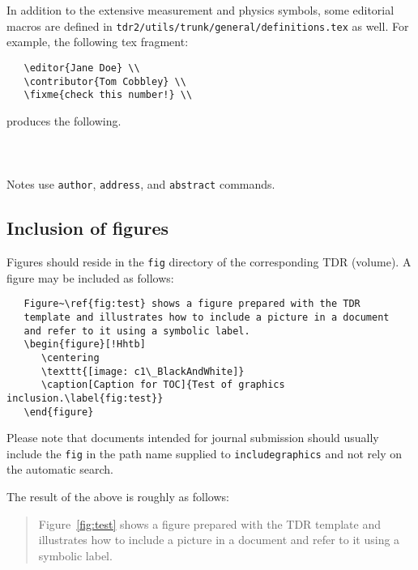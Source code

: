 In addition to the extensive measurement and physics symbols,
some editorial macros are defined in
\texttt{tdr2/utils/trunk/general/definitions.tex} as well.
For example, the following tex fragment:
\begin{verbatim}
   \editor{Jane Doe} \\
   \contributor{Tom Cobbley} \\
   \fixme{check this number!} \\
\end{verbatim}
%
produces the following. \\
\bigbreak
{}\mbox{~}\\
\mbox{~} \\
\mbox{~}\\

Notes use \texttt{author}, \texttt{address}, and \texttt{abstract} commands.



\subsection{Inclusion of figures}

Figures should reside in the \texttt{fig} directory of the corresponding TDR (volume).
A figure may be included as follows:
%
\begin{verbatim}
   Figure~\ref{fig:test} shows a figure prepared with the TDR
   template and illustrates how to include a picture in a document
   and refer to it using a symbolic label.
   \begin{figure}[!Hhtb]
      \centering
      \texttt{[image: c1\_BlackAndWhite]}
      \caption[Caption for TOC]{Test of graphics inclusion.\label{fig:test}}
   \end{figure}
\end{verbatim}
%
Please note that documents intended for journal submission should usually include the \texttt{fig} in the path name supplied to \texttt{includegraphics} and not rely on the automatic search.

The result of the above is roughly as follows:
%

\begin{quote}
Figure~\ref{fig:test} shows a figure prepared with the TDR
    template and illustrates how to include
a picture in a document and refer to it using a symbolic label.
\end{quote}

